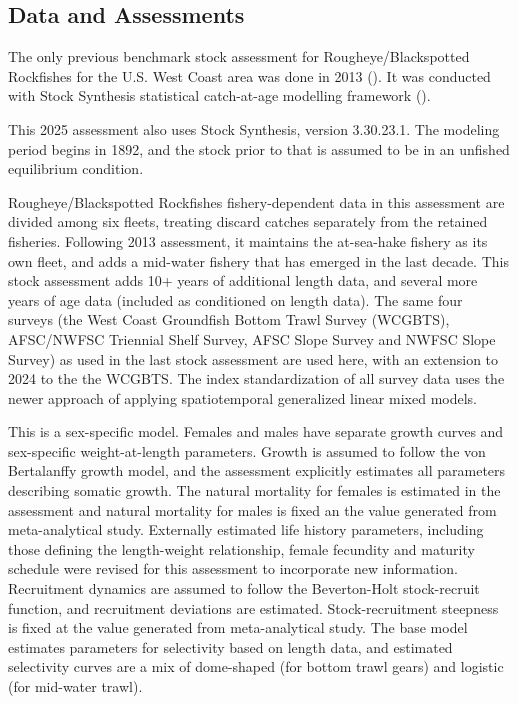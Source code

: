 \documentclass[
]{scrartcl}
\begin{document}
\subsection{Data and Assessments}\label{data-and-assessments}

The only previous benchmark stock assessment for Rougheye/Blackspotted
Rockfishes for the U.S. West Coast area was done in 2013
(). It
was conducted with Stock Synthesis statistical catch-at-age modelling
framework ().

This 2025 assessment also uses Stock Synthesis, version 3.30.23.1. The
modeling period begins in 1892, and the stock prior to that is assumed
to be in an unfished equilibrium condition.

Rougheye/Blackspotted Rockfishes fishery-dependent data in this
assessment are divided among six fleets, treating discard catches
separately from the retained fisheries. Following 2013 assessment, it
maintains the at-sea-hake fishery as its own fleet, and adds a mid-water
fishery that has emerged in the last decade. This stock assessment adds
10+ years of additional length data, and several more years of age data
(included as conditioned on length data). The same four surveys (the
West Coast Groundfish Bottom Trawl Survey (WCGBTS), AFSC/NWFSC Triennial
Shelf Survey, AFSC Slope Survey and NWFSC Slope Survey) as used in the
last stock assessment are used here, with an extension to 2024 to the
the WCGBTS. The index standardization of all survey data uses the newer
approach of applying spatiotemporal generalized linear mixed models.

This is a sex-specific model. Females and males have separate growth
curves and sex-specific weight-at-length parameters. Growth is assumed
to follow the von Bertalanffy growth model, and the assessment
explicitly estimates all parameters describing somatic growth. The
natural mortality for females is estimated in the assessment and natural
mortality for males is fixed an the value generated from meta-analytical
study. Externally estimated life history parameters, including those
defining the length-weight relationship, female fecundity and maturity
schedule were revised for this assessment to incorporate new
information. Recruitment dynamics are assumed to follow the
Beverton-Holt stock-recruit function, and recruitment deviations are
estimated. Stock-recruitment steepness is fixed at the value generated
from meta-analytical study. The base model estimates parameters for
selectivity based on length data, and estimated selectivity curves are a
mix of dome-shaped (for bottom trawl gears) and logistic (for mid-water
trawl).
\end{document}
